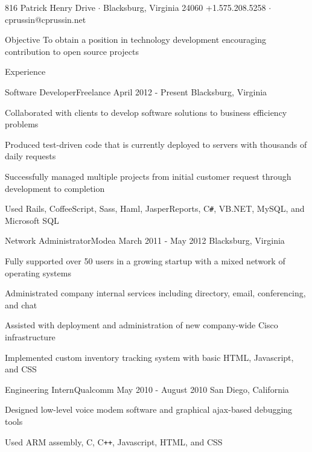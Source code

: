 \documentclass{resume}
\begin{document}
	           {816 Patrick Henry Drive $\cdot$ Blacksburg, Virginia 24060}
	           {+1.575.208.5258 $\cdot$ cprussin@cprussin.net}

	\begin{section}{Objective}
		To obtain a position in technology development encouraging contribution
		to open source projects
	\end{section}

	\begin{section}{Experience}
		\begin{experience}{Software Developer}{Freelance}
		                  {April 2012 - Present}
		                  {Blacksburg, Virginia}
			\item Collaborated with clients to develop software solutions to business
			      efficiency problems
			\item Produced test-driven code that is currently deployed to servers
			      with thousands of daily requests
			\item Successfully managed multiple projects from initial customer
			      request through development to completion
			\item Used Rails, CoffeeScript, Sass, Haml, JasperReports, C\texttt{\#},
			      VB.NET, MySQL, and Microsoft SQL
		\end{experience}

		\begin{experience}{Network Administrator}{Modea}
		                  {March 2011 - May 2012}
		                  {Blacksburg, Virginia}
			\item Fully supported over 50 users in a growing startup with a mixed
			      network of operating systems
			\item Administrated company internal services including directory, email,
			      conferencing, and chat
			\item Assisted with deployment and administration of new company-wide
			      Cisco infrastructure
			\item Implemented custom inventory tracking system with basic HTML,
			      Javascript, and CSS
		\end{experience}

		\begin{experience}{Engineering Intern}{Qualcomm}
		                  {May 2010 - August 2010}
		                  {San Diego, California}
			\item Designed low-level voice modem software and graphical ajax-based
			      debugging tools
			\item Used ARM assembly, C, C\texttt{++}, Javascript, HTML, and CSS
		\end{experience}


\end{section}
\end{document}
